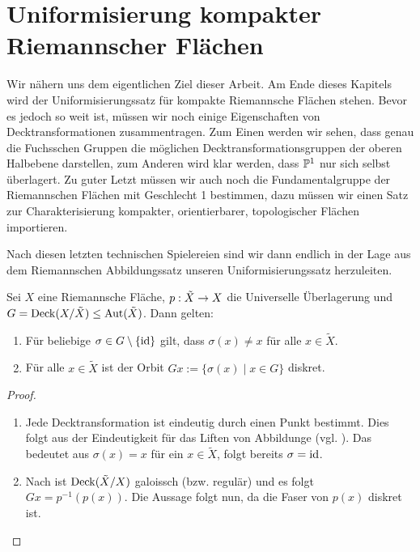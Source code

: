 \section{Uniformisierung kompakter Riemannscher Flächen}
\label{sec:uniformisierung}

Wir nähern uns dem eigentlichen Ziel dieser Arbeit. Am Ende dieses
Kapitels wird der Uniformisierungssatz für kompakte Riemannsche
Flächen stehen. Bevor es jedoch so weit ist, müssen wir noch einige
Eigenschaften von Decktransformationen zusammentragen. Zum Einen
werden wir sehen, dass genau die Fuchsschen Gruppen die möglichen
Decktransformationsgruppen der oberen Halbebene darstellen, zum Anderen
wird klar werden, dass $\P^1$ nur sich selbst überlagert. Zu guter
Letzt müssen wir auch noch die Fundamentalgruppe der Riemannschen
Flächen mit Geschlecht 1 bestimmen, dazu müssen wir einen Satz zur
Charakterisierung kompakter, orientierbarer, topologischer Flächen
importieren.

Nach diesen letzten technischen Spielereien sind wir dann endlich in
der Lage aus dem Riemannschen Abbildungssatz unseren
Uniformisierungssatz herzuleiten.

\begin{lemma}
  \label{lemma:decktrafo-diskret}
  Sei $X$ eine Riemannsche Fläche, $p: \tilde X \ra X$ die
  Universelle Überlagerung und $G = \Deck(X /\tilde X) \leq
  \Aut(\tilde X)$. Dann gelten:
  \begin{enumerate}
  \item Für beliebige $\sigma \in G \setminus \{\id\}$ gilt, dass $\sigma
    (x) \neq x $ für alle $x \in \tilde X$.
  \item Für alle $x \in \tilde X$ ist der Orbit $Gx := \{ \sigma(x)
    \mid x \in G\}$ diskret.
  \end{enumerate}
\end{lemma}

\begin{proof}
  \begin{enumerate}
  \item Jede Decktransformation ist eindeutig durch einen Punkt
    bestimmt. Dies folgt aus der Eindeutigkeit für das Liften von
    Abbildunge (vgl. \cite[Satz 4.8]{For}). Das bedeutet aus
    $\sigma(x) = x$ für ein $x \in \tilde X$, folgt
    bereits $\sigma = \id$.
  \item Nach \cite[Satz 5.6]{For} ist $\Deck(\tilde X/X)$ galoissch
    (bzw. regulär) und
    es folgt \break$Gx = p^{-1}(p(x))$. Die Aussage folgt nun, da die Faser
    von $p(x)$ diskret ist.
  \end{enumerate}
\end{proof}

